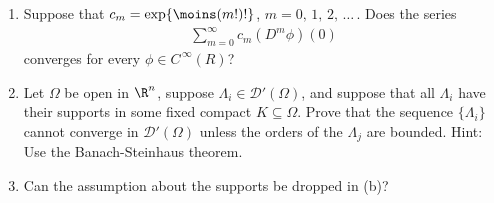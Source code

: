 \renewcommand{\labelenumi}{(\alph{enumi})} 
{\CMUCS
\begin{enumerate}
\item Suppose that $c_m=\exp\{\moins (m!)!\}$, $m=0,\, 1,\, 2,\, \dots\, $. Does the series
\begin{align*}{
\sum_{m=0}^\infty c_m (D^m\phi)(0)
}\end{align*}
converges for every $\phi\in C^{\,\infty} (R)$?
\item Let $\Omega$ be open in $\R^n$, suppose $\Lambda_i\in \mathscr{D}'(\Omega)$, and suppose that all $\Lambda_i$ have their supports in some fixed compact $K\subseteq \Omega$. Prove that the sequence $\{\Lambda_i\}$ cannot converge in $\mathscr{D}'(\Omega)$ unless the orders of the $\Lambda_j$ are bounded. Hint: Use the Banach-Steinhaus theorem.
\item Can the assumption about the supports be dropped in (b)?
\end{enumerate}}
